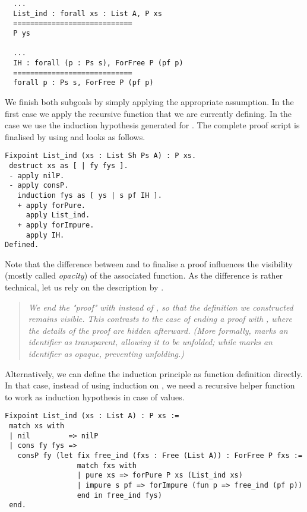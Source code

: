 \begin{verbatim}
  ...
  List_ind : forall xs : List A, P xs
  ============================
  P ys

  ...
  IH : forall (p : Ps s), ForFree P (pf p)
  ============================
  forall p : Ps s, ForFree P (pf p)
\end{verbatim}

We finish both subgoals by simply applying the appropriate assumption.
In the first case we apply the recursive function  that we are currently defining.
In the  case we use the induction hypothesis generated for .
The complete proof script is finalised by using  and looks as follows.

\begin{verbatim}
Fixpoint List_ind (xs : List Sh Ps A) : P xs.
 destruct xs as [ | fy fys ].
 - apply nilP.
 - apply consP.
   induction fys as [ ys | s pf IH ].
   + apply forPure.
     apply List_ind.
   + apply forImpure.
     apply IH.
Defined.
\end{verbatim}

Note that the difference between  and  to finalise a proof influences the visibility (mostly called \emph{opacity}) of the associated function.
As the difference is rather technical, let us rely on the description by \citet{chlipala2011certified}.

\begin{quote}
\emph{We end the "proof" with  instead of , so that the definition we constructed remains visible.
This contrasts to the case of ending a proof with , where the details of the proof are hidden afterward.
(More formally,  marks an identifier as transparent, allowing it to be unfolded; while  marks an identifier as opaque, preventing unfolding.)}
\end{quote}

Alternatively, we can define the induction principle as function definition directly.
In that case, instead of using induction on , we need a recursive helper function  to work as induction hypothesis in case of  values.

\begin{verbatim}
Fixpoint List_ind (xs : List A) : P xs :=
 match xs with
 | nil         => nilP
 | cons fy fys =>
   consP fy (let fix free_ind (fxs : Free (List A)) : ForFree P fxs :=
                 match fxs with
                 | pure xs => forPure P xs (List_ind xs)
                 | impure s pf => forImpure (fun p => free_ind (pf p))
                 end in free_ind fys)
 end.
\end{verbatim}


